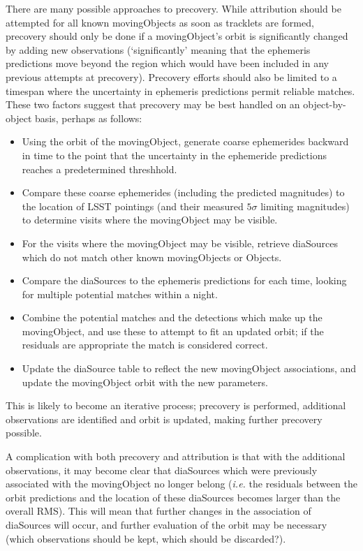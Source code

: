 There are many possible approaches to precovery. While attribution should be attempted for all known movingObjects as soon as tracklets are formed, precovery should only be done if a movingObject's orbit is significantly changed by adding new observations (`significantly' meaning that the ephemeris predictions move beyond the region which would have been included in any previous attempts at precovery). Precovery efforts should also be limited to a timespan where the uncertainty in ephemeris predictions permit reliable matches. These two factors suggest that precovery may be best handled on an object-by-object basis, perhaps as follows: 
\begin{itemize}
\item{Using the orbit of the movingObject, generate coarse ephemerides backward in time to the point that the uncertainty in the ephemeride predictions reaches a predetermined threshhold.}
\item{Compare these coarse ephemerides (including the predicted magnitudes) to the location of LSST pointings (and their measured $5\sigma$ limiting magnitudes) to determine visits where the movingObject may be visible.}
\item{For the visits where the movingObject may be visible, retrieve diaSources which do not match other known movingObjects or Objects.}
\item{Compare the diaSources to the ephemeris predictions for each time, looking for multiple potential matches within a night.}
\item{Combine the potential matches and the detections which make up the movingObject, and use these to attempt to fit an updated orbit; if the residuals are appropriate the match is considered correct.}
\item{Update the diaSource table to reflect the new movingObject associations, and update the movingObject orbit with the new parameters.}
\end{itemize}

This is likely to become an iterative process; precovery is performed, additional observations are identified and orbit is updated, making further precovery possible. 

A complication with both precovery and attribution is that with the additional observations, it may become clear that diaSources which were previously associated with the movingObject no longer belong ({\it i.e.} the residuals between the orbit predictions and the location of these diaSources becomes larger than the overall RMS). This will mean that further changes in the association of diaSources will occur, and further evaluation of the orbit may be necessary (which observations should be kept, which should be discarded?).  
